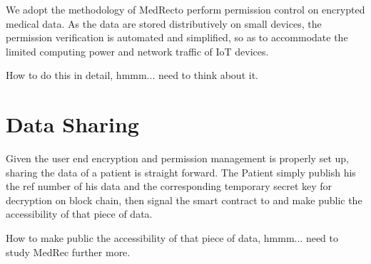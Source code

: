 \documentclass[]{scrartcl}
\theoremstyle{definition}
\begin{document}
We adopt the methodology of MedRec\cite{MedRecWhitePaper}to perform permission control on encrypted medical data. As the data are stored distributively on small devices, the permission verification is automated and simplified, so as to accommodate the limited computing power and network traffic of IoT devices.

How to do this in detail, hmmm... need to think about it.

\section{Data Sharing}

Given the user end encryption and permission management is properly set up, sharing the data of a patient is straight forward. The Patient simply publish his the ref number of his data and the corresponding temporary secret key for decryption on block chain, then signal the smart contract to and make public the accessibility of that piece of data.

How to make public the accessibility of that piece of data, hmmm... need to study MedRec further more.






 


\end{document}
